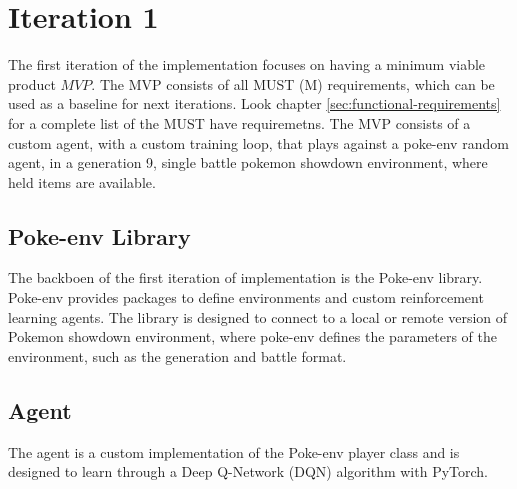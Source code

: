 \section{Iteration 1}
\label{sec:Iteration-1-Agent-Environment}

The first iteration of the implementation focuses on having a minimum viable product \(MVP\). The MVP
consists of all MUST (M) requirements, which can be used as a baseline for next iterations.
Look chapter \ref{sec:functional-requirements} for a complete list of the MUST have requiremetns.
The MVP consists of a custom agent, with a custom training loop, that plays against a poke-env random agent,
in a generation 9, single battle pokemon showdown environment, where held items are available. 

\subsection{Poke-env Library}
The backboen of the first iteration of implementation is the Poke-env library. 
Poke-env provides packages to define environments and custom reinforcement learning agents. 
The library is designed to connect to a local or remote version of Pokemon showdown environment, 
where poke-env defines the parameters of the environment, such as the generation and battle format.


\subsection{Agent}
The agent is a custom implementation of the Poke-env player class and is designed to learn through 
a Deep Q-Network (DQN) algorithm with PyTorch. 


